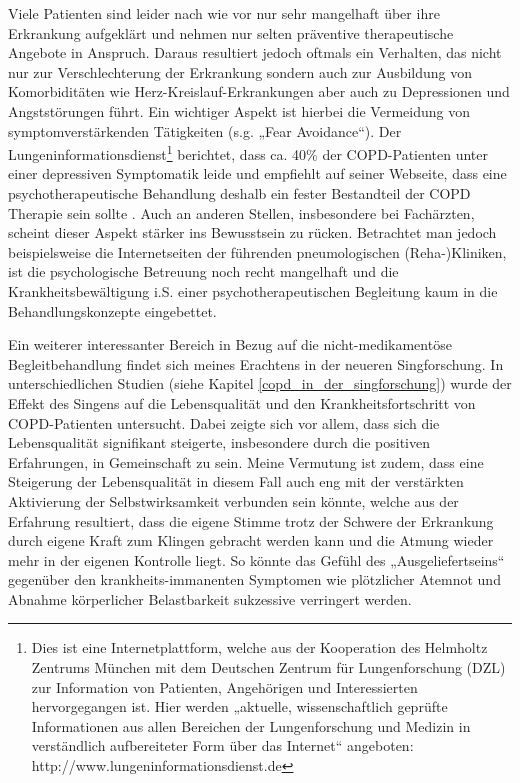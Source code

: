Viele Patienten sind leider nach wie vor nur sehr mangelhaft über ihre Erkrankung aufgeklärt und nehmen nur selten präventive therapeutische Angebote in Anspruch. Daraus resultiert jedoch oftmals ein Verhalten, das nicht nur zur Verschlechterung der Erkrankung sondern auch zur Ausbildung von Komorbiditäten wie Herz-Kreislauf-Erkrankungen aber auch zu Depressionen und Angststörungen führt. Ein wichtiger Aspekt ist hierbei die Vermeidung von symptomverstärkenden Tätigkeiten (s.g. „Fear Avoidance“). Der Lungeninformationsdienst\footnote{Dies ist eine Internetplattform, welche aus der Kooperation des  Helmholtz Zentrums München mit dem Deutschen Zentrum für Lungenforschung (DZL) zur Information von Patienten, Angehörigen und Interessierten hervorgegangen ist. Hier werden „aktuelle, wissenschaftlich geprüfte Informationen aus allen Bereichen der Lungenforschung und Medizin in verständlich aufbereiteter Form über das Internet“ angeboten: http://www.lungeninformationsdienst.de} berichtet, dass ca. 40\% der COPD-Patienten unter einer depressiven Symptomatik leide und empfiehlt auf seiner Webseite, dass eine psychotherapeutische Behandlung deshalb ein fester Bestandteil der COPD Therapie sein sollte \autocite[vgl.][]{lungeninformationsdienst2011}. Auch an anderen Stellen, insbesondere bei Fachärzten, scheint dieser Aspekt stärker ins Bewusstsein zu rücken. Betrachtet man jedoch beispielsweise die Internetseiten der führenden pneumologischen (Reha-)Kliniken, ist die psychologische Betreuung noch recht mangelhaft und die Krankheitsbewältigung i.S. einer psychotherapeutischen Begleitung kaum in die Behandlungskonzepte eingebettet. 

Ein weiterer interessanter Bereich in Bezug auf die nicht-medikamentöse Begleitbehandlung findet sich meines Erachtens in der neueren Singforschung. In unterschiedlichen Studien (siehe Kapitel \ref{copd_in_der_singforschung}) wurde der Effekt des Singens auf die Lebensqualität und den Krankheitsfortschritt von COPD-Patienten untersucht. Dabei zeigte sich vor allem, dass sich die Lebensqualität signifikant steigerte, insbesondere durch die positiven Erfahrungen, in Gemeinschaft zu sein. Meine Vermutung ist zudem, dass eine Steigerung der Lebensqualität in diesem Fall auch eng mit der verstärkten Aktivierung der Selbstwirksamkeit verbunden sein könnte, welche aus der Erfahrung resultiert, dass die eigene Stimme trotz der Schwere der Erkrankung durch eigene Kraft zum Klingen gebracht werden kann und die Atmung wieder mehr in der eigenen Kontrolle liegt. So könnte das Gefühl des „Ausgeliefertseins“ gegenüber den krankheits-immanenten Symptomen wie plötzlicher Atemnot und Abnahme körperlicher Belastbarkeit  sukzessive verringert werden.

